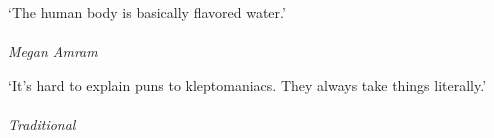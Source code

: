 \clearpage

\narrowlinespacing

\vspace*{4mm}

`The human body is basically flavored water.'\\
\\
\emph{Megan Amram}

\vspace*{4mm}

`It's hard to explain puns to kleptomaniacs. They always take things literally.'\\
\\
\emph{Traditional}

\normallinespacing
